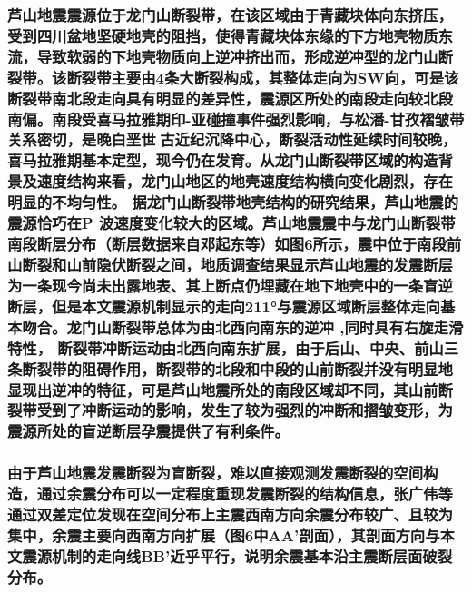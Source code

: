 \documentclass[a4paper,12pt,single,pdftex]{scrartcl}
\begin{document}
\label{ID_411413530}\subsubsection{芦山地震震源位于龙门山断裂带，在该区域由于青藏块体向东挤压，受到四川盆地坚硬地壳的阻挡，使得青藏块体东缘的下方地壳物质东流，导致软弱的下地壳物质向上逆冲挤出而，形成逆冲型的龙门山断裂带\cite{Zhang2013}。该断裂带主要由4条大断裂构成\cite{邓起东1994,李智武2008}，其整体走向为SW向，可是该断裂带南北段走向具有明显的差异性\cite{郭正吾1996,Jia2006,Arne1997,邓康龄2007}，震源区所处的南段走向较北段南偏。南段受喜马拉雅期印-亚碰撞事件强烈影响，与松潘-甘孜褶皱带关系密切，是晚白垩世古近纪沉降中心，断裂活动性延续时间较晚，喜马拉雅期基本定型，现今仍在发育\cite{李智武2008}。从龙门山断裂带区域的构造背景及速度结构来看，龙门山地区的地壳速度结构横向变化剧烈，存在明显的不均匀性\cite{Zhang2013,Wang2010,张忠杰2009,雷建设2009,Zhang2011}。 据龙门山断裂带地壳结构的研究结果\cite{雷建设2009}，芦山地震的震源恰巧在P 波速度变化较大的区域。芦山地震震中与龙门山断裂带南段断层分布（断层数据来自邓起东等\cite{邓起东2002}）如图6所示，震中位于南段前山断裂和山前隐伏断裂之间，地质调查结果\cite{徐锡伟2013,徐锡伟2013a}显示芦山地震的发震断层为一条现今尚未出露地表、其上断点仍埋藏在地下地壳中的一条盲逆断层，但是本文震源机制显示的走向211°与震源区域断层整体走向基本吻合。龙门山断裂带总体为由北西向南东的逆冲 ,同时具有右旋走滑特性\cite{唐荣昌1991,李勇2006,Densmore2007,陈国光2007}， 断裂带冲断运动由北西向南东扩展，由于后山、中央、前山三条断裂带的阻碍作用，断裂带的北段和中段的山前断裂并没有明显地显现出逆冲的特征，可是芦山地震所处的南段区域却不同，其山前断裂带受到了冲断运动的影响，发生了较为强烈的冲断和摺皱变形，为震源所处的盲逆断层孕震提供了有利条件。}

\label{ID_1585639519}\subsubsection{由于芦山地震发震断裂为盲断裂，难以直接观测发震断裂的空间构造，通过余震分布可以一定程度重现发震断裂的结构信息，张广伟等\cite{张广伟2013}通过双差定位发现在空间分布上主震西南方向余震分布较广、且较为集中，余震主要向西南方向扩展（图6中AA'剖面），其剖面方向与本文震源机制的走向线BB'近乎平行，说明余震基本沿主震断层面破裂分布。}
\end{document}
